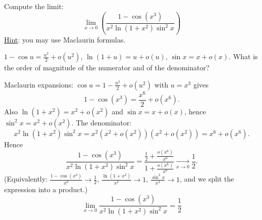 
\begin{question}
Compute the limit:
\[ \lim_{x\to0}\left(\frac{1-\cos(x^3)}{x^2\ln(1+x^2)\sin^2x}\right) \]
\underline{Hint}: you may use Maclaurin formulas.
\end{question}

\begin{hint}
$1-\cos u=\frac{u^2}{2}+o(u^2)$, $\ln(1+u)=u+o(u)$, $\sin x=x+o(x)$. What is the order of magnitude of the numerator and of the denominator?
\end{hint}

\begin{solution}
Maclaurin expansions: $\cos u=1-\frac{u^2}{2}+o(u^2)$ with $u=x^3$ gives
\[ 1-\cos(x^3)=\frac{x^6}{2}+o(x^6). \]
Also $\ln(1+x^2)=x^2+o(x^2)$ and $\sin x=x+o(x)$, hence $\sin^2x=x^2+o(x^2)$. The denominator:
\[ x^2\ln(1+x^2)\sin^2x=x^2\left(x^2+o(x^2)\right)\left(x^2+o(x^2)\right)=x^6+o(x^6). \]
Hence
\[ \frac{1-\cos(x^3)}{x^2\ln(1+x^2)\sin^2x}=\frac{\frac12+\frac{o(x^6)}{x^6}}{1+\frac{o(x^6)}{x^6}}\xrightarrow[x\to0]{}\frac12. \]
(Equivalently: $\frac{1-\cos(x^3)}{x^6}\to\frac12$, $\frac{\ln(1+x^2)}{x^2}\to1$, $\frac{\sin^2x}{x^2}\to1$, and we split the expression into a product.)
\[ \boxed{\lim_{x\to0}\frac{1-\cos(x^3)}{x^2\ln(1+x^2)\sin^2x}=\frac12} \]
\end{solution}
